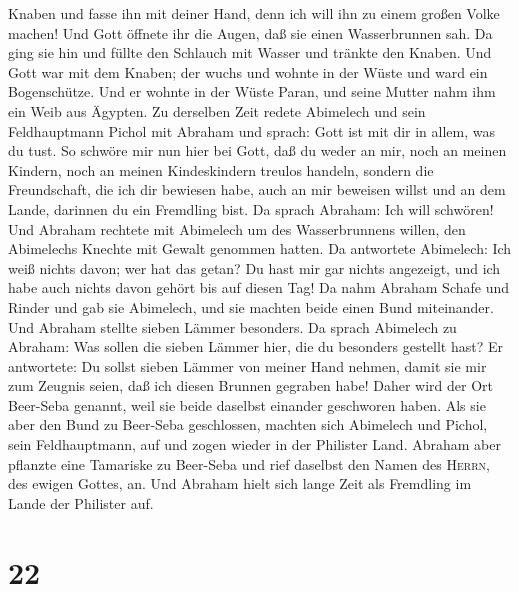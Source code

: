 Knaben und fasse ihn mit deiner Hand, denn ich will ihn zu einem großen
Volke machen!  Und Gott öffnete ihr die Augen, daß sie
einen Wasserbrunnen sah. Da ging sie hin und füllte den Schlauch mit
Wasser und tränkte den Knaben.  Und Gott war mit dem
Knaben; der wuchs und wohnte in der Wüste und ward ein Bogenschütze.
 Und er wohnte in der Wüste Paran, und seine Mutter nahm
ihm ein Weib aus Ägypten.  Zu derselben Zeit redete
Abimelech und sein Feldhauptmann Pichol mit Abraham und sprach: Gott ist
mit dir in allem, was du tust.  So schwöre mir nun hier
bei Gott, daß du weder an mir, noch an meinen Kindern, noch an meinen
Kindeskindern treulos handeln, sondern die Freundschaft, die ich dir
bewiesen habe, auch an mir beweisen willst und an dem Lande, darinnen du
ein Fremdling bist.  Da sprach Abraham: Ich will
schwören!  Und Abraham rechtete mit Abimelech um des
Wasserbrunnens willen, den Abimelechs Knechte mit Gewalt genommen
hatten.  Da antwortete Abimelech: Ich weiß nichts davon;
wer hat das getan? Du hast mir gar nichts angezeigt, und ich habe auch
nichts davon gehört bis auf diesen Tag!  Da nahm Abraham
Schafe und Rinder und gab sie Abimelech, und sie machten beide einen
Bund miteinander.  Und Abraham stellte sieben Lämmer
besonders.  Da sprach Abimelech zu Abraham: Was sollen
die sieben Lämmer hier, die du besonders gestellt hast? 
Er antwortete: Du sollst sieben Lämmer von meiner Hand nehmen, damit sie
mir zum Zeugnis seien, daß ich diesen Brunnen gegraben habe!
 Daher wird der Ort Beer-Seba genannt, weil sie beide
daselbst einander geschworen haben.  Als sie aber den
Bund zu Beer-Seba geschlossen, machten sich Abimelech und Pichol, sein
Feldhauptmann, auf und zogen wieder in der Philister Land.
 Abraham aber pflanzte eine Tamariske zu Beer-Seba und
rief daselbst den Namen des \textsc{Herrn}, des ewigen Gottes, an.
 Und Abraham hielt sich lange Zeit als Fremdling im Lande
der Philister auf.

\hypertarget{section-21}{%
\section{22}\label{section-21}}

